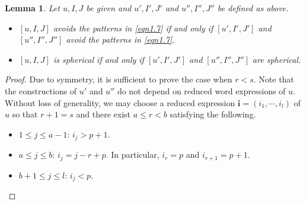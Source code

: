 \documentclass[12pt]{amsart}
\newtheorem{lemma}[theorem]{Lemma}
\theoremstyle{definition}
\theoremstyle{remark}
\begin{document}
\begin{lemma}\label{lem6.2}
Let $u,I,J$ be given and $u',I',J'$ and $u'', I'', J''$ be defined as above.
\begin{itemize}
\item[(a)] $[u,I,J]$ avoids the patterns in \eqref{eqn1.7} if and only if $[u',I',J']$ and $[u'',I'',J'']$ avoid the patterns in \eqref{eqn1.7}.
\item[(b)] $[u,I,J]$ is spherical if and only if $[u',I',J']$ and $[u'',I'',J'']$ are spherical.
\end{itemize}
\end{lemma}
\begin{proof}
Due to symmetry, it is sufficient to prove the case when $r<s$. Note that the constructions of $u'$ and $u''$ do not depend on reduced word expressions of $u$. Without loss of generality, we may choose a reduced expression $\mathbf{i} = (i_1 , \cdots , i_l)$ of $u$ so that $r+1 = s$ and there exist $a \leq r < b$ satisfying the following.
\begin{itemize}
\item $1 \leq j \leq a-1$: $i_j >p+1$.
\item $ a\leq j \leq b$: $i_j = j-r+p$. In particular, $i_r = p$ and $i_{r+1} = p+1$.
\item $b+1 \leq j \leq l$: $i_j <p$.  
\end{itemize}


\end{proof}
\end{document}
